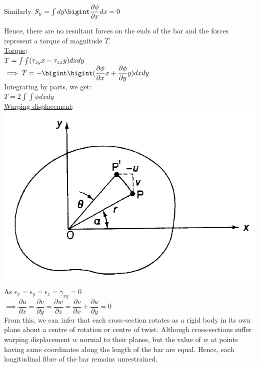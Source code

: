 \documentclass{article}
\begin{document}
\noindent Similarly $S_y=\int dy\bigint\dfrac{\partial\phi}{\partial x}dx=0$

\noindent Hence, there are no resultant forces on the ends of the bar and the forces represent a torque of magnitude $T$.\\
\newpage
\noindent \underline{Torque}:\\

\noindent $T=\int\Huge\int (\tau_{zy}x- \tau_{zx}y)dxdy$\\
$\implies T=-\bigint\bigint(\dfrac{\partial\phi}{\partial x}x + \dfrac{\partial\phi}{\partial y}y)dxdy$\\
Integrating by parts, we get:\\
$T=2\int\int\phi dxdy$ \\

\noindent \underline{Warping displacement}:\\

\includegraphics[scale=0.6]{2.png}\\

As $\epsilon_x=\epsilon_y=\epsilon_z=\gamma_{xy}=0$\\
$\implies \dfrac{\partial u}{\partial x}=\dfrac{\partial v}{\partial y}=\dfrac{\partial w}{\partial z}=\dfrac{\partial v}{\partial x}+\dfrac{\partial u}{\partial y}=0$\\

\noindent From this, we can infer that each cross-section rotates as a rigid body in its own plane about a centre of rotation or centre of twist. Although cross-sections suffer warping displacement $w$ normal to their planes, but the value of $w$ at points having same coordinates along the length of the bar are equal. Hence, each longitudinal fibre of the bar remains unrestrained. 
\end{document}
